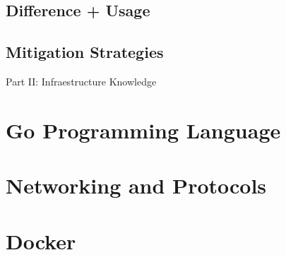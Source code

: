 \documentclass[a4paper]{article}
\begin{document}
    \subsection{Difference + Usage}
    \subsection{Mitigation Strategies}


    \newpage

    \thispagestyle{empty} %
    \vspace*{\fill}
    \begin{center}
        \Huge Part II: Infraestructure Knowledge
    \end{center}
    \vspace*{\fill}
    \newpage


    \section{Go Programming Language}
    \subsection{}
    \subsection{}

    \newpage
    \section{Networking and Protocols}
    \subsection{}
    \subsection{}

    \newpage
    \section{Docker}
    \subsection{}
    \subsection{}
    
\end{document}
